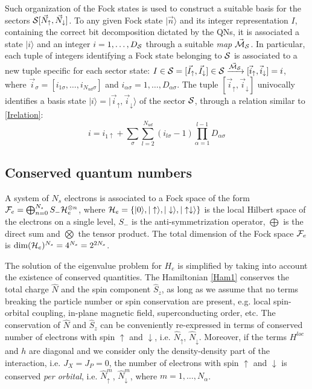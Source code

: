 \documentclass[final,3p,10pt]{elsarticle}
\newcommand{\ket}[1]
{|#1\rangle}
\def\a{\alpha}       \def\b{\beta}   \def\g{\gamma}   \def\d{\delta}
\def\up{\uparrow} \def\down{\downarrow} \def\dw{\downarrow}
\begin{document}
Such organization of the Fock states is used to construct
a suitable basis for the sectors $\SS[\vec{N}_\up,\vec{N}_\dw]$.
To any given Fock state $\ket{\vec{n}}$ and its
integer representation $I$, containing the correct bit decomposition
dictated by the QNs, it is associated a state $\ket{i}$ and an integer
$i=1,\dots,D_{\cal S}$ through a suitable \textit{map} $\vec{{\cal M}}_{\cal S}$.
In particular,
each tuple of integers identifying a Fock state belonging to ${\cal S}$ is associated to a new
tuple specific for each sector state:
$I\in\SS=[\vec{I}_\up,\vec{I}_\dw]\in\SS \xrightarrow{\vec{\MM}_\SS}
[\vec{i}_\up,\vec{i}_\dw]=i$, 
where $\vec{i}_\sigma=[i_{1\sigma},\dots,i_{N_{ud}\sigma}]$ and
$i_{\a\sigma}=1,\dots,D_{\a\sigma}$.
The tuple $[\vec{i}_\up,\vec{i}_\dw]$ univocally identifies a basis state
$\ket{i}=\ket{\vec{i}_\up,\vec{i}_\dw}$ of the sector ${\cal S}$, through a
relation similar to \eqref{Irelation}:
\begin{equation}
i = i_{1\up} +
\sum_\sigma\sum_{l=2}^{N_{ud}}(i_{l\sigma}-1)\prod_{\a=1}^{l-1}D_{\a\sigma}
\label{SectorIndxDecomp}
\end{equation}



  
\subsection{Conserved quantum numbers}\label{sSecQNs}
A system of $N_s$ electrons is associated to
a Fock space of the form ${\cal F}_e=\bigoplus_{n=0}^{N_s}
S_-{\cal H}_e^{\otimes n}$,  where $\HH_e=\{\ket{0},\ket{\up},\ket{\dw},\ket{\up\dw} \}$ is the local
Hilbert space of the electrons on a single level,
$S_-$ is the anti-symmetrization operator, $\bigoplus$ is the direct sum and
$\bigotimes$ the tensor product.
The total dimension of the Fock space ${\cal F}_e$ is
$\text{dim}({\cal H}_e)^{N_s}=4^{N_s}= 2^{2N_s}$. 

The solution of the eigenvalue problem for $H_e$ is simplified by taking
into account the existence of conserved quantities.
The Hamiltonian \eqref{Ham1} conserves the total charge
$\hat{N}$ and the spin component $\hat{S}_z$, as long as we assume
that no terms  breaking the particle number or spin conservation are present,
e.g. local spin-orbital coupling, in-plane magnetic field,
superconducting order, etc.
The conservation of  $\hat{N}$ and $\hat{S}_z$ can be conveniently
re-expressed in terms of conserved number of electrons with spin $\up$ and $\dw$, i.e. $\hat{N}_\up$,
$\hat{N}_\dw$.
Moreover,  if the terms $H^{loc}$ and $h$ are
diagonal and we consider only the density-density part of the
interaction, i.e. $J_X=J_P=0$, the number of electrons with spin $\up$ and $\dw$ is conserved \textit{per
  orbital}, i.e. $\hat{N}^m_\up$, $\hat{N}^m_\dw$, where
$m=1,\dots,N_\alpha$.
\end{document}

